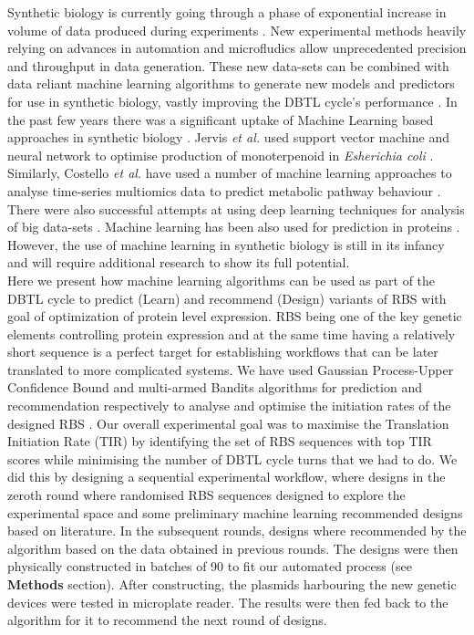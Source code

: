 \documentclass{article}
\begin{document}
Synthetic biology is currently going through a phase of exponential increase in volume of data produced during experiments \cite{Freemont2019}. 
New experimental methods heavily relying on advances in automation and microfludics allow unprecedented precision and throughput in data generation.
These new data-sets can be combined with data reliant machine learning algorithms to generate new models and predictors for use in synthetic biology, vastly improving the DBTL cycle's performance \cite{Camacho2018}. 
In the past few years there was a significant uptake of Machine Learning based approaches in synthetic biology \cite{LAWSON2021}.
Jervis \emph{et al.} used support vector machine and neural network to optimise production of monoterpenoid in \emph{Esherichia coli} \cite{Jervis2019}.
Similarly, Costello \emph{et al.} have used a number of machine learning approaches to analyse time-series multiomics data to predict metabolic pathway behaviour \cite{Costello2018}.
There were also successful attempts at using deep learning techniques for analysis of big data-sets \cite{Alipanahi2015,Angermueller2016}. Machine learning has been also used for prediction in proteins \cite{Yang2018}.
However, the use of machine learning in synthetic biology is still in its infancy and will require additional research to show its full potential. \\
Here we present how machine learning algorithms can be used as part of the DBTL cycle to predict (Learn) and recommend (Design) variants of RBS with goal of optimization of protein level expression. RBS being one of the key genetic elements controlling protein expression and at the same time having a relatively short sequence is a perfect target for establishing workflows that can be later translated to more complicated systems.
We have used Gaussian Process-Upper Confidence Bound and multi-armed Bandits algorithms for prediction and recommendation respectively to analyse and optimise the initiation rates of the designed RBS \cite{desautels2012parallelizing, Rasmussen2004}.
Our overall experimental goal was to maximise the Translation Initiation Rate (TIR) by identifying the set of RBS sequences with top TIR scores while minimising the number of DBTL cycle turns that we had to do.
We did this by designing a sequential experimental workflow, where designs in the zeroth round where randomised RBS sequences designed to explore the experimental space and some preliminary machine learning recommended designs based on literature. 
In the subsequent rounds, designs where recommended by the algorithm based on the data obtained in previous rounds. 
The designs were then physically constructed in batches of 90 to fit our automated process (see \textbf{Methods} section).
After constructing, the plasmids harbouring the new genetic devices were tested in microplate reader.
The results were then fed back to the algorithm for it to recommend the next round of designs.\\
\end{document}
